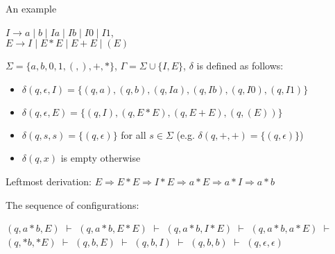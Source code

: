 \documentclass[handout]{beamer}
\begin{document}
\begin{frame}{An example}

    \begin{example}
        $I\rightarrow a\mid b\mid Ia\mid Ib\mid I0\mid I1$,\\
        $E\rightarrow I\mid E*E\mid E+E\mid (E)$
    \end{example}
        
    $\Sigma=\{a,b,0,1,(,),+,*\}$, $\Gamma=\Sigma\cup\{I,E\}$,  $\delta$ is defined as follows:

    \begin{itemize}
        \item $\delta(q,\epsilon,I)=\{(q,a),(q,b),(q,Ia),(q,Ib),(q,I0),(q,I1)\}$
        \item $\delta(q,\epsilon,E)=\{(q,I),(q,E*E),(q,E+E),(q,(E))\}$
        \item $\delta(q,s,s)=\{(q,\epsilon)\}$ for all $s\in \Sigma$ (e.g. $\delta(q,+,+)=\{(q,\epsilon)\}$)
        \item $\delta(q,x)$ is empty otherwise
    \end{itemize}

    \alert{Leftmost derivation:} $E\Rightarrow E*E\Rightarrow I*E\Rightarrow a*E\Rightarrow a*I\Rightarrow a*b$\\       	
    
    \medskip

    The sequence of configurations:

    $(q,a*b,E)$
    $\vdash$ $(q,a*b,E*E)$
    $\vdash$ $(q,a*b,I*E)$
    $\vdash$ $(q,a*b,a*E)$
    $\vdash$ $(q,*b,*E)$
    $\vdash$ $(q,b,E)$
    $\vdash$ $(q,b,I)$
    $\vdash$ $(q,b,b)$
    $\vdash$ $(q,\epsilon,\epsilon)$

\end{frame}
\end{document}
